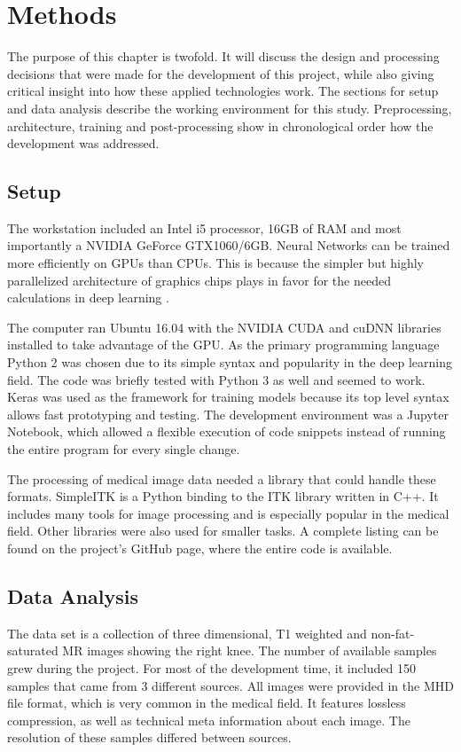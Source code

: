 \section{Methods}

The purpose of this chapter is twofold. It will discuss the design and processing decisions that were made for the development of this project, while also giving critical insight into how these applied technologies work. The sections for setup and data analysis describe the working environment for this study. Preprocessing, architecture, training and post-processing show in chronological order how the development was addressed.

\subsection{Setup}

The workstation included an Intel i5 processor, 16GB of RAM and most importantly a NVIDIA GeForce GTX1060/6GB. Neural Networks can be trained more efficiently on GPUs than CPUs. This is because the simpler but highly parallelized architecture of graphics chips plays in favor for the needed calculations in deep learning \cite{NVIDIA}.

The computer ran Ubuntu 16.04 with the NVIDIA CUDA and cuDNN libraries installed to take advantage of the GPU. As the primary programming language Python 2 was chosen due to its simple syntax and popularity in the deep learning field. The code was briefly tested with Python 3 as well and seemed to work. Keras was used as the framework for training models because its top level syntax allows fast prototyping and testing. The development environment was a Jupyter Notebook, which allowed a flexible execution of code snippets instead of running the entire program for every single change.

The processing of medical image data needed a library that could handle these formats. SimpleITK is a Python binding to the ITK library written in C++. It includes many tools for image processing and is especially popular in the medical field. Other libraries were also used for smaller tasks. A complete listing can be found on the project's GitHub page, where the entire code is available.

\subsection{Data Analysis}

The data set is a collection of three dimensional, T1 weighted and non-fat-saturated MR images showing the right knee. The number of available samples grew during the project. For most of the development time, it included 150 samples that came from 3 different sources. All images were provided in the MHD file format, which is very common in the medical field. It features lossless compression, as well as technical meta information about each image. The resolution of these samples differed between sources.

